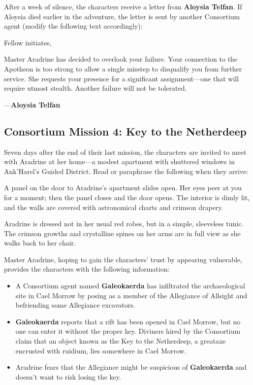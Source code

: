\documentclass[10pt,a4paper,twoside,fancy,bg=print,twocolumn,openany,nodeprecatedcode]{dndbook}
\begin{document}
After a week of silence, the characters receive a letter from \textbf{Aloysia Telfan}. If Aloysia died earlier in the adventure, the letter is sent by another Consortium agent (modify the following text accordingly):

\begin{DndReadAloud}{}
Fellow initiates,

Master Aradrine has decided to overlook your failure. Your connection to the Apotheon is too strong to allow a single misstep to disqualify you from further service. She requests your presence for a significant assignment—one that will require utmost stealth. Another failure will not be tolerated.

—\textbf{Aloysia Telfan}

\end{DndReadAloud}

\subsection{Consortium Mission 4: Key to the Netherdeep}
Seven days after the end of their last mission, the characters are invited to meet with Aradrine at her home—a modest apartment with shuttered windows in Ank'Harel's Guided District. Read or paraphrase the following when they arrive:

\begin{DndReadAloud}{}
A panel on the door to Aradrine's apartment slides open. Her eyes peer at you for a moment; then the panel closes and the door opens. The interior is dimly lit, and the walls are covered with astronomical charts and crimson drapery.

Aradrine is dressed not in her usual red robes, but in a simple, sleeveless tunic. The crimson growths and crystalline spines on her arms are in full view as she walks back to her chair.

\end{DndReadAloud}

Master Aradrine, hoping to gain the characters' trust by appearing vulnerable, provides the characters with the following information:


\begin{itemize}
\item A Consortium agent named \textbf{Galeokaerda} has infiltrated the archaeological site in Cael Morrow by posing as a member of the Allegiance of Allsight and befriending some Allegiance excavators.
\item \textbf{Galeokaerda} reports that a rift has been opened in Cael Morrow, but no one can enter it without the proper key. Diviners hired by the Consortium claim that an object known as the Key to the Netherdeep, a greataxe encrusted with ruidium, lies somewhere in Cael Morrow.
\item Aradrine fears that the Allegiance might be suspicious of \textbf{Galeokaerda} and doesn't want to risk losing the key.
\end{itemize}
\end{document}
